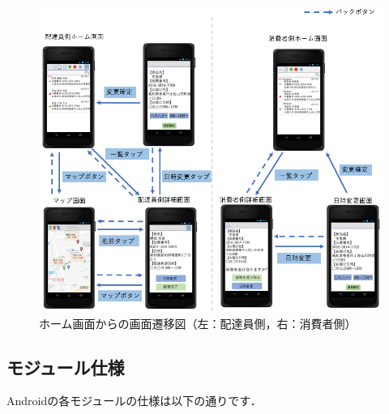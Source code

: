 \documentclass[a4j,titlepage]{jarticle}
\begin{document}
\begin{figure}[H]
 \begin{center}
  \includegraphics[width=150mm]{screen_transition_home.png}
  \caption{ホーム画面からの画面遷移図（左：配達員側，右：消費者側）}
  \label{fig:home}
 \end{center}
\end{figure}

\subsection{モジュール仕様}
Androidの各モジュールの仕様は以下の通りです．
\end{document}
